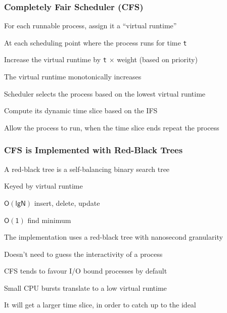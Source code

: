   \begin{frame}
    \frametitle{Completely Fair Scheduler (CFS)}

    For each runnable process, assign it a ``virtual runtime''

    \hspace{2em} At each scheduling point where the process runs for time \texttt{t}

    \hspace{4em} Increase the virtual runtime by \texttt{t} $\mathsf{\times}$ weight (based on priority)

    \vspace{2em}

    The virtual runtime monotonically increases

    \hspace{2em} Scheduler selects the process based on the lowest virtual runtime

    \hspace{4em} Compute its dynamic time slice based on the IFS

    \vspace{2em}

    Allow the process to run, when the time slice ends repeat the process
  \end{frame}
  
  \begin{frame}
    \frametitle{CFS is Implemented with Red-Black Trees}

    A red-black tree is a self-balancing binary search tree

    \hspace{2em} Keyed by virtual runtime

    \hspace{4em} $\mathsf{O(lg N)}$ insert, delete, update

    \hspace{4em} $\mathsf{O(1)}$ find minimum

    \vspace{2em}

    The implementation uses a red-black tree with nanosecond granularity

    \hspace{2em} Doesn't need to guess the interactivity of a process

    \vspace{2em}

    CFS tends to favour I/O bound processes by default

    \hspace{2em} Small CPU bursts translate to a low virtual runtime

    \hspace{4em} It will get a larger time slice, in order to catch up to the ideal
  \end{frame}

